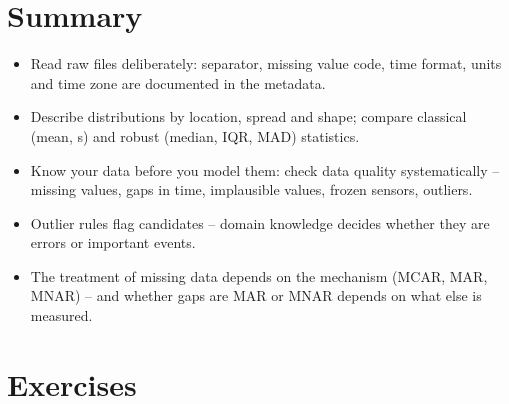 \documentclass[
  letterpaper,
  DIV=11,
  numbers=noendperiod]{scrreprt}
\providecommand{\tightlist}{%
  \setlength{\itemsep}{0pt}\setlength{\parskip}{0pt}}\usepackage{longtable,booktabs,array}
\begin{document}
\section{Summary}\label{summary-2}

\begin{tcolorbox}[enhanced jigsaw, left=2mm, title=\textcolor{quarto-callout-important-color}{\faExclamation}\hspace{0.5em}{Key takeaways}, opacityback=0, breakable, rightrule=.15mm, arc=.35mm, toptitle=1mm, colbacktitle=quarto-callout-important-color!10!white, opacitybacktitle=0.6, coltitle=black, colframe=quarto-callout-important-color-frame, bottomrule=.15mm, leftrule=.75mm, bottomtitle=1mm, titlerule=0mm, toprule=.15mm, colback=white]

\begin{itemize}
\tightlist
\item
  Read raw files deliberately: separator, missing value code, time
  format, units and time zone are documented in the metadata.
\item
  Describe distributions by location, spread and shape; compare
  classical (mean, s) and robust (median, IQR, MAD) statistics.
\item
  Know your data before you model them: check data quality
  systematically -- missing values, gaps in time, implausible values,
  frozen sensors, outliers.
\item
  Outlier rules flag candidates -- domain knowledge decides whether they
  are errors or important events.
\item
  The treatment of missing data depends on the mechanism (MCAR, MAR,
  MNAR) -- and whether gaps are MAR or MNAR depends on what else is
  measured.
\end{itemize}

\end{tcolorbox}

\section{Exercises}\label{exercises-2}
\end{document}
